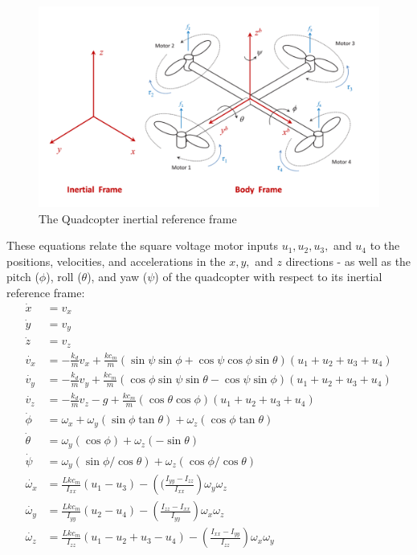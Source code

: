 \documentclass[12pt]{article}
\begin{document}
\begin{figure}[h]
\includegraphics[scale=0.18]{images/Quadcopter Inertial Frame.png}
\centering
\caption{The Quadcopter inertial reference frame}
\end{figure}
These equations relate the square voltage motor inputs $u_1,u_2,u_3,$ and $u_4$ to the positions, velocities, 
and accelerations in the $x,y,$ and $z$ directions - as well as the pitch ($\phi$), roll ($\theta$), 
and yaw ($\psi$) of the quadcopter with respect to its inertial reference frame:
\begin{align*}
    \dot{x} &= v_x \\
    \dot{y} &= v_y \\
    \dot{z} &= v_z \\
    \dot{v_x} &= -\frac{k_d}{m}v_x + \frac{kc_m}{m}(\sin\psi\sin\phi + \cos\psi\cos\phi\sin\theta)(u_1 + u_2 + u_3 + u_4) \\
    \dot{v_y} &= -\frac{k_d}{m}v_y + \frac{kc_m}{m}(\cos\phi\sin\psi\sin\theta - \cos\psi\sin\phi)(u_1 + u_2 + u_3 + u_4)\\
    \dot{v_z} &= -\frac{k_d}{m}v_z -g + \frac{kc_m}{m}(\cos\theta\cos\phi)(u_1 + u_2 + u_3 + u_4) \\
    \dot{\phi} &= \omega_x + \omega_y(\sin\phi\tan\theta) + \omega_z(\cos\phi\tan\theta) \\
    \dot{\theta} &= \omega_y(\cos\phi) + \omega_z(-\sin\theta) \\
    \dot{\psi} &= \omega_y(\sin\phi/\cos\theta) + \omega_z(\cos\phi/\cos\theta) \\
    \dot{\omega_x} &= \frac{Lkc_m}{I_{xx}}(u_1 - u_3) - \left((\frac{I_{yy} - I_{zz}}{I_{xx}}\right)\omega_y \omega_z \\
    \dot{\omega_y} &= \frac{Lkc_m}{I_{yy}}(u_2 - u_4) - \left(\frac{I_{zz} - I_{xx}}{I_{yy}}\right)\omega_x \omega_z \\
    \dot{\omega_z} &= \frac{Lkc_m}{I_{zz}}(u_1 - u_2 + u_3 - u_4) - \left(\frac{I_{xx} - I_{yy}}{I_{zz}}\right)\omega_x \omega_y \\
\end{align*}
\end{document}
